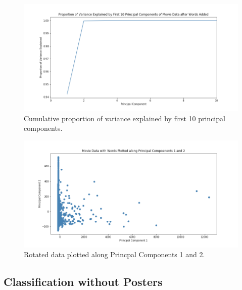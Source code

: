 \documentclass[12pt, oneside]{article}   	%
\begin{document}
\begin{figure}%
\includegraphics[width=\textwidth]{pca_var_explained}
\caption{\label{fig:pca_var_explained}Cumulative proportion of variance explained by first 10 principal components.}
\end{figure}

\begin{figure}%
\includegraphics[width=\textwidth]{pc1_pc2}
\caption{\label{fig:pc1_pc2}Rotated data plotted along Princpal Components 1 and 2.}
\end{figure}

\subsection{Classification without Posters}
\label{section:class_no_posters_results}
\end{document}
